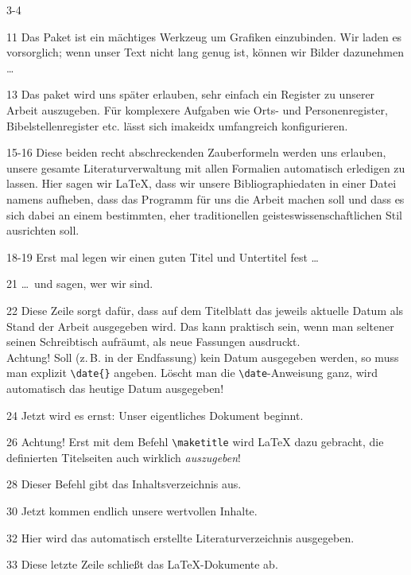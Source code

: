 \begin{labeling}{3-4}
 \item[11] Das Paket  ist ein mächtiges Werkzeug um Grafiken
   einzubinden.  Wir laden es vorsorglich; wenn unser Text nicht lang genug
   ist, können wir Bilder dazunehmen \dots
 
 \item[13] Das paket  wird uns später erlauben, sehr einfach
   ein Register zu unserer Arbeit auszugeben.  Für komplexere Aufgaben wie
   Orts- und Personenregister, Bibelstellenregister etc. lässt sich imakeidx
   umfangreich konfigurieren.
 
 \item[15-16] Diese beiden recht abschreckenden Zauberformeln werden uns
   erlauben, unsere gesamte Literaturverwaltung mit allen Formalien
   automatisch erledigen zu lassen.  Hier sagen wir \LaTeX{}, dass wir
   unsere Bibliographiedaten in einer Datei namens
    aufheben, dass das Programm
    für uns die Arbeit machen soll und dass es sich dabei
   an einem bestimmten, eher traditionellen geisteswissenschaftlichen Stil
   ausrichten soll.

 \item[18-19] Erst mal legen wir einen guten Titel und Untertitel fest \dots

 \item[21] \dots\ und sagen, wer wir sind.
 
 \item[22] Diese Zeile sorgt dafür, dass auf dem Titelblatt das jeweils
   aktuelle Datum als Stand der Arbeit ausgegeben wird. Das kann praktisch
   sein, wenn man seltener seinen Schreibtisch aufräumt, als neue Fassungen
   ausdruckt.\\ Achtung! Soll (z.\,B. in der Endfassung) kein Datum
   ausgegeben werden, so muss man explizit \lstinline/\date{}/ angeben.
   Löscht man die \lstinline/\date/-Anweisung ganz, wird automatisch das
   heutige Datum ausgegeben!

 \item[24] Jetzt wird es ernst: Unser eigentliches Dokument beginnt.
 
 \item[26] Achtung! Erst mit dem Befehl \lstinline/\maketitle/ wird \LaTeX{}
   dazu gebracht, die definierten Titelseiten auch wirklich
   \emph{auszugeben}!

 \item[28] Dieser Befehl gibt das Inhaltsverzeichnis aus.

 \item[30] Jetzt kommen endlich unsere wertvollen Inhalte.
 
 \item[32] Hier wird das automatisch erstellte Literaturverzeichnis ausgegeben.
 
 \item[33] Diese letzte Zeile schließt das \LaTeX{}-Dokumente ab.

 \end{labeling}

